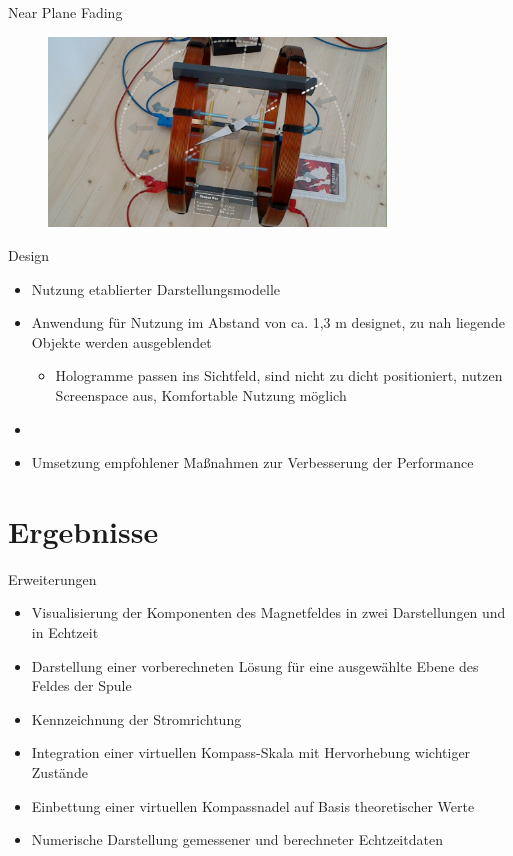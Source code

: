 \begin{frame}[fragile]{Near Plane Fading}
\begin{figure}
	\includegraphics[width=0.8\textwidth]{images/HL/compass.jpg}
\end{figure}
\end{frame}

\begin{frame}[fragile]{Design}
\begin{itemize}
	\item Nutzung etablierter Darstellungsmodelle
	\pause
	\item Anwendung für Nutzung im Abstand von ca. 1,3 m designet, zu nah liegende Objekte werden ausgeblendet
	\begin{itemize}
		\item Hologramme passen ins Sichtfeld, sind nicht zu dicht positioniert, nutzen Screenspace aus, Komfortable Nutzung möglich
	\end{itemize}
	\pause
	\item 
	\pause
	\item Umsetzung empfohlener Maßnahmen zur Verbesserung der Performance
\end{itemize}
\end{frame}


\part{Ergebnisse}
\label{part:results}
\begin{frame}[fragile]{Erweiterungen}
\begin{itemize}
	\item Visualisierung der Komponenten des Magnetfeldes in zwei Darstellungen und in Echtzeit
	\item Darstellung einer vorberechneten Lösung für eine ausgewählte Ebene des Feldes der Spule
	\item Kennzeichnung der Stromrichtung
	\item Integration einer virtuellen Kompass-Skala mit Hervorhebung wichtiger Zustände
	\item Einbettung einer virtuellen Kompassnadel auf Basis theoretischer Werte
	\item Numerische Darstellung gemessener und berechneter Echtzeitdaten
\end{itemize}
\end{frame}


